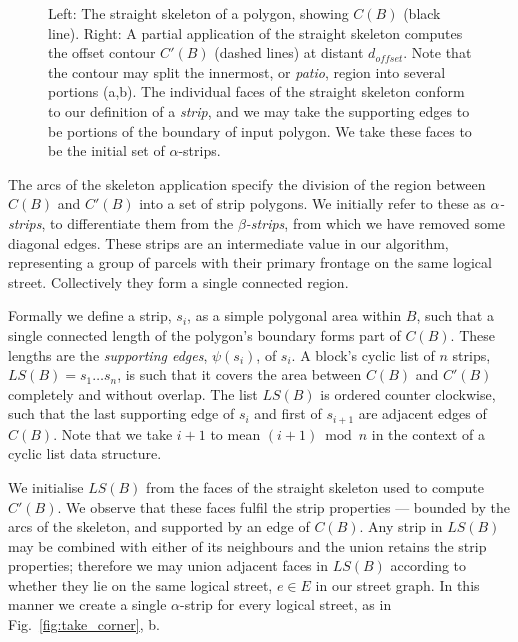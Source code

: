 \begin{figure}
\centering
\def\svgwidth{0.7\columnwidth}

\caption[A perimeter block's depth]{\label{fig:stripskeleton}Left: The straight skeleton of a polygon, showing $C(B)$ (black line). Right: A partial application of the straight skeleton computes the offset contour $C'(B)$ (dashed lines) at distant $d_{offset}$. Note that the contour may split the innermost, or \emph{patio}, region into several portions (a,b). The individual faces of the straight skeleton conform to our definition of a \emph{strip}, and we may take the supporting edges to be portions of the boundary of input polygon. We take these faces to be the initial set of $\alpha$-strips.}
\end{figure}


The arcs of the skeleton application specify the division of the region between $C(B)$ and $C'(B)$ into a set of strip polygons. We initially refer to these as \emph{$\alpha$-strips}, to differentiate them from the \emph{$\beta$-strips}, from which we have removed some diagonal edges. These strips are an intermediate value in our algorithm, representing a group of parcels with their primary frontage on the same logical street. Collectively they form a single connected region. 
 
Formally we define a strip, $s_i$, as a simple polygonal area within $B$, such that a single connected length of the polygon's boundary forms part of $C(B)$. These lengths are the \emph{supporting edges}, $\psi(s_i)$, of $s_i$. A block's cyclic list of $n$ strips, $LS(B) = {s_1 \ldots s_n}$, is such that it covers the area between $C(B)$ and $C'(B)$ completely and without overlap.
The list $LS(B)$ is ordered counter clockwise, such that the last supporting edge of $s_i$ and first of $s_{i+1}$ are adjacent edges of $C(B)$. Note that we take $i+1$ to mean $(i+1) \bmod n$ in the context of a cyclic list data structure.

We initialise $LS(B)$ from the faces of the straight skeleton used to compute $C'(B)$. We observe that these faces fulfil the strip properties --- bounded by the arcs of the skeleton, and supported by an edge of $C(B)$. Any strip in $LS(B)$ may be combined with either of its neighbours and the union retains the strip properties; therefore we may union adjacent faces in $LS(B)$ according to whether they lie on the same logical street, $e \in E$ in our street graph. In this manner we create a single $\alpha$-strip for every logical street, as in Fig.~\ref{fig:take_corner}, b.

